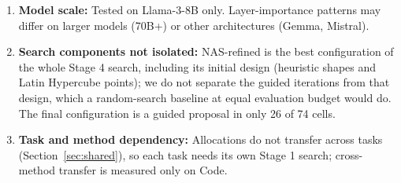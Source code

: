 \documentclass[11pt]{article}
\begin{document}
\begin{enumerate}
\item \textbf{Model scale:} Tested on Llama-3-8B only. Layer-importance patterns may differ on larger models (70B+) or other architectures (Gemma, Mistral).
\item \textbf{Search components not isolated:} NAS-refined is the best configuration of the whole Stage 4 search, including its initial design (heuristic shapes and Latin Hypercube points); we do not separate the guided iterations from that design, which a random-search baseline at equal evaluation budget would do. The final configuration is a guided proposal in only 26 of 74 cells.
\item \textbf{Task and method dependency:} Allocations do not transfer across tasks (Section~\ref{sec:shared}), so each task needs its own Stage 1 search; cross-method transfer is measured only on Code.
\end{enumerate}

\FloatBarrier




\end{document}

